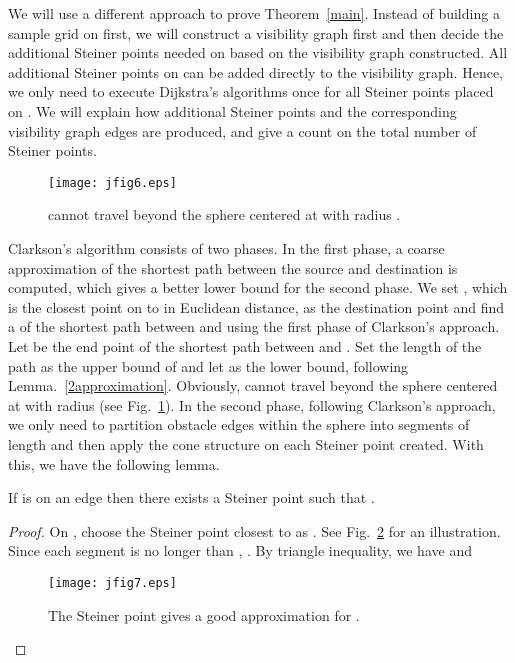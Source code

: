 \documentclass{llncs}
\begin{document}
We will use a different approach to prove Theorem~\ref{main}.
Instead of building a sample grid on  first, we will construct a visibility graph first and then
decide the additional Steiner points needed on  based on the visibility graph constructed.
All additional Steiner points on  can be added directly to the visibility graph.
Hence, we only need to execute Dijkstra's algorithms once for all Steiner points placed on .
We will explain how additional Steiner points and the corresponding visibility graph edges are produced, and give a count on the total number of Steiner points.

\begin{figure}\begin{center}
    \leavevmode
\texttt{[image: jfig6.eps]}
    \caption{ cannot travel beyond the sphere  centered at  with radius .}
    \label{jfig6}
    \end{center}
\end{figure}

Clarkson's algorithm consists of two phases. In the first phase, a coarse approximation of
the shortest path between the source and destination is computed, which gives a better lower bound
for the second phase. We set , which is the closest point on  to  in Euclidean distance,
as the destination point and find a  of the shortest path between 
and  using
the first phase of Clarkson's approach. Let  be the end point of the shortest path between
 and . Set the length of the  path as the upper bound  of 
and let  as the lower bound, following Lemma.~\ref{2approximation}. Obviously,  cannot
travel beyond the sphere centered at  with radius  (see Fig.~\ref{jfig6}). In the second phase,
following Clarkson's approach, we only need to partition obstacle edges within the sphere into
segments of length  and then apply the cone structure on each Steiner point created.
With this, we have the following lemma.

\begin{lemma}
\label{lemma-edge}
If  is on an edge  then there exists a Steiner point  such that
.
\end{lemma}

\begin{proof}
On , choose the Steiner point closest to  as .
See Fig.~\ref{jfig7} for an illustration.
Since each segment is no longer than
, .
By triangle inequality, we have  and
\\

\hfill 


\begin{figure}\begin{center}
    \leavevmode
\texttt{[image: jfig7.eps]}
    \caption{The Steiner point  gives a good approximation for .}
    \label{jfig7}
    \end{center}
\end{figure}
\hfill 
\end{proof}
\end{document}
